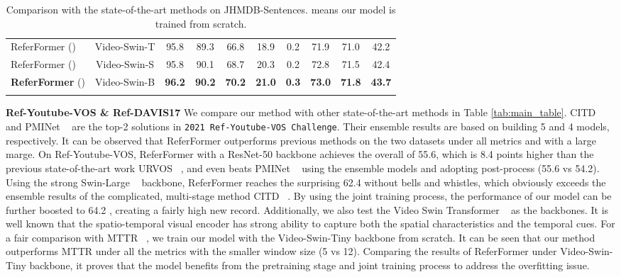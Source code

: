\documentclass[10pt,twocolumn,letterpaper]{article}
\newcommand{\myparagraph}[1]{{\vspace{.5em} \noindent \bf #1}}
\begin{document}
{\begin{table*}[t]
\begin{center}
\begin{tabular}{l | c | c c c c c | c c | c}
\arrayrulecolor{white}\hline
\arrayrulecolor{black}\hline
\arrayrulecolor{white}\hline

ReferFormer () & Video-Swin-T & 95.8 & 89.3 & 66.8 & 18.9 & 0.2 & 71.9 & 71.0 & 42.2 \\

ReferFormer () & Video-Swin-S & 95.8 & 90.1 & 68.7 & 20.3 & 0.2 & 72.8 & 71.5 & 42.4 \\

\textbf{ReferFormer} () & Video-Swin-B & \textbf{96.2} & \textbf{90.2} & \textbf{70.2} & \textbf{21.0} & \textbf{0.3} & \textbf{73.0} & \textbf{71.8} & \textbf{43.7} \\


\arrayrulecolor{white}\hline
\arrayrulecolor{black}\hline
\arrayrulecolor{white}\hline



\end{tabular}     \end{center}
    \vspace{-4mm}
    \caption{Comparison with the state-of-the-art methods on JHMDB-Sentences.  means our model is trained from scratch.}
    \label{tab:jhmdb_table}
    \vspace{-2mm}
\end{table*}


\myparagraph{Ref-Youtube-VOS \& Ref-DAVIS17 } 
We compare our method with other state-of-the-art methods in Table \ref{tab:main_table}. CITD ~\cite{liang2021topdown} and PMINet ~\cite{ding2021pminet} are the top-2 solutions in \texttt{2021 Ref-Youtube-VOS Challenge}. Their ensemble results are based on building 5 and 4 models, respectively. It can be observed that ReferFormer outperforms previous methods on the two datasets under all metrics and with a large marge. On Ref-Youtube-VOS, ReferFormer with a ResNet-50 backbone achieves the overall  of 55.6, which is 8.4 points higher than the previous state-of-the-art work URVOS ~\cite{seo2020urvos}, and even beats PMINet ~\cite{ding2021pminet} using the ensemble models and adopting post-process (55.6 vs 54.2). Using the strong Swin-Large ~\cite{liu2021swin} backbone, ReferFormer reaches the surprising 62.4  without bells and whistles, which obviously exceeds the ensemble results of the complicated, multi-stage method CITD ~\cite{liang2021topdown}. By using the joint training process, the performance of our model can be further boosted to 64.2 , creating a fairly high new record. Additionally, we also test the Video Swin Transformer ~\cite{liu2021videoswin} as the backbones. It is well known that the spatio-temporal visual encoder has strong ability to capture both the spatial characteristics and the temporal cues. For a fair comparison with MTTR ~\cite{botach2021mttr}, we train our model with the Video-Swin-Tiny backbone from scratch. It can be seen that our method outperforms MTTR under all the metrics with the smaller window size (5 vs 12). Comparing the results of ReferFormer under Video-Swin-Tiny backbone, it proves that the model benefits from the pretraining stage and joint training process to address the overfitting issue.

}
\end{document}
